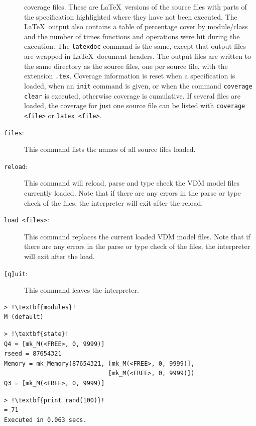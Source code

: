 \documentclass{overturerepchap}
\begin{document}
\begin{description}
  coverage files. These are \LaTeX\ versions of the source files
  with parts of the
  specification highlighted where they have not been executed. The
  \LaTeX\ output also contains a table of percentage cover by
  module/class and the number of times functions and operations were
  hit during the execution. The \texttt{latexdoc} command is the same,
  except that output files are wrapped in \LaTeX\ document headers. The
  output files are written to the same directory as the source files, one
  per source file, with the extension \texttt{.tex}. Coverage
  information is reset when a specification is loaded, when an \texttt{init}
  command is given, or when the
  command \texttt{coverage clear} is executed, otherwise coverage is
  cumulative. If several files are loaded, the coverage for just one
  source file can be listed with \texttt{coverage <file>} or
  \texttt{latex <file>}. 
\item[\texttt{files}:] This command lists the names of all source files loaded.
\item[\texttt{reload}:] This command will reload, parse and type check the
  VDM model files currently loaded. Note that if there are any errors
  in the parse or type check of the files, the interpreter will exit
  after the reload.
\item[\texttt{load <files>}:] This command replaces the current loaded VDM
  model files. Note that if there are any errors in the parse or type
  check of the files, the interpreter will exit after
  the load.
\item[\texttt{[q]uit}:] This command leaves the
  interpreter.
\end{description}

\begin{lstlisting}
> !\textbf{modules}!
M (default)
\end{lstlisting}

\begin{lstlisting}
> !\textbf{state}!
Q4 = [mk_M(<FREE>, 0, 9999)]
rseed = 87654321
Memory = mk_Memory(87654321, [mk_M(<FREE>, 0, 9999)],
                             [mk_M(<FREE>, 0, 9999)])
Q3 = [mk_M(<FREE>, 0, 9999)]
\end{lstlisting}

\begin{lstlisting}
> !\textbf{print rand(100)}!
= 71
Executed in 0.063 secs.
\end{lstlisting}
\end{document}
